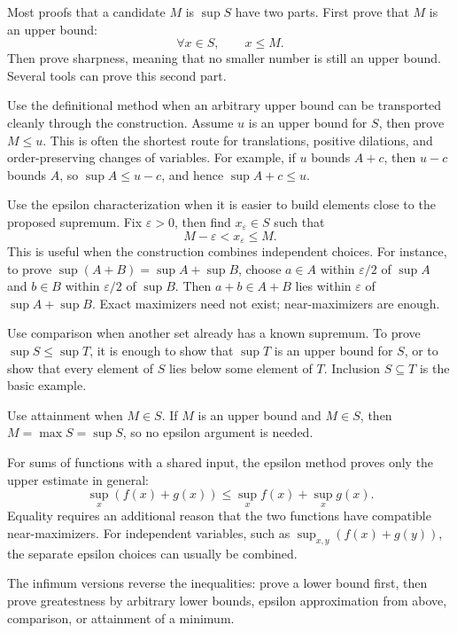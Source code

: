\begin{remark}
Most proofs that a candidate \(M\) is \(\sup S\) have two parts.  First prove
that \(M\) is an upper bound:
\[
  \forall x\in S,\qquad x\le M.
\]
Then prove sharpness, meaning that no smaller number is still an upper bound.
Several tools can prove this second part.

Use the definitional method when an arbitrary upper bound can be transported
cleanly through the construction.  Assume \(u\) is an upper bound for \(S\),
then prove \(M\le u\).  This is often the shortest route for translations,
positive dilations, and order-preserving changes of variables.  For example,
if \(u\) bounds \(A+c\), then \(u-c\) bounds \(A\), so
\(\sup A\le u-c\), and hence \(\sup A+c\le u\).

Use the epsilon characterization when it is easier to build elements close to
the proposed supremum.  Fix \(\varepsilon>0\), then find
\(x_\varepsilon\in S\) such that
\[
  M-\varepsilon < x_\varepsilon \le M.
\]
This is useful when the construction combines independent choices.  For
instance, to prove \(\sup(A+B)=\sup A+\sup B\), choose \(a\in A\) within
\(\varepsilon/2\) of \(\sup A\) and \(b\in B\) within \(\varepsilon/2\) of
\(\sup B\).  Then \(a+b\in A+B\) lies within \(\varepsilon\) of
\(\sup A+\sup B\).  Exact maximizers need not exist; near-maximizers are
enough.

Use comparison when another set already has a known supremum.  To prove
\(\sup S\le \sup T\), it is enough to show that \(\sup T\) is an upper bound
for \(S\), or to show that every element of \(S\) lies below some element of
\(T\).  Inclusion \(S\subseteq T\) is the basic example.

Use attainment when \(M\in S\).  If \(M\) is an upper bound and \(M\in S\),
then \(M=\max S=\sup S\), so no epsilon argument is needed.

For sums of functions with a shared input, the epsilon method proves only the
upper estimate in general:
\[
  \sup_x(f(x)+g(x))\le \sup_x f(x)+\sup_x g(x).
\]
Equality requires an additional reason that the two functions have compatible
near-maximizers.  For independent variables, such as
\(\sup_{x,y}(f(x)+g(y))\), the separate epsilon choices can usually be
combined.

The infimum versions reverse the inequalities: prove a lower bound first,
then prove greatestness by arbitrary lower bounds, epsilon approximation from
above, comparison, or attainment of a minimum.
\end{remark}

